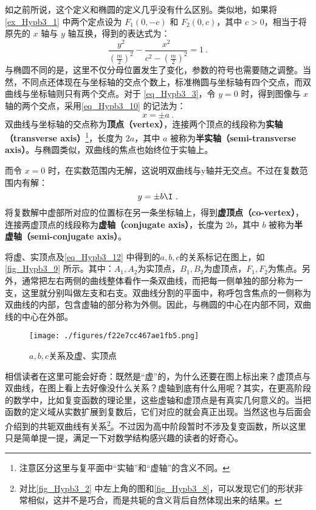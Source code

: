 如之前所说，这个定义和椭圆的定义几乎没有什么区别。类似地，如果将 \autoref{ex_Hypb3_1} 中两个定点设为 $F_1(0,-c)$ 和 $F_2(0,c)$，其中 $c>0$，相当于将原先的 $x$ 轴与 $y$ 轴互换，得到的表达式为：
\begin{equation}\label{eq_Hypb3_7}
\frac{y^2}{\left(\displaystyle\frac{m}{2}\right)^2}-\frac{x^2}{\displaystyle c^2-\left(\frac{m}{2}\right)^2} =1~.
\end{equation}
与椭圆不同的是，这里不仅分母位置发生了变化，参数的符号也需要随之调整。当然，不同点还体现在与坐标轴的交点个数上，标准椭圆与坐标轴有四个交点，而双曲线与坐标轴则只有两个交点。对于 \autoref{eq_Hypb3_3}，令 $y=0$ 时，得到图像与 $x$ 轴的两个交点，采用\autoref{eq_Hypb3_10} 的记法为：
\begin{equation}
x = \pm a~.
\end{equation}
双曲线与坐标轴的交点称为\textbf{顶点（vertex）}，连接两个顶点的线段称为\textbf{实轴（transverse axis）}\footnote{注意区分这里与复平面中“实轴”和“虚轴”的含义不同。}，长度为 $2a$，其中 $a$ 被称为\textbf{半实轴（semi-transverse axis）}。与椭圆类似，双曲线的焦点也始终位于实轴上。

而令 $x=0$ 时，在实数范围内无解，这说明双曲线与y轴并无交点。不过在复数范围内有解：
\begin{equation}
y = \pm  b\I~.
\end{equation}
将复数解中虚部所对应的位置标在另一条坐标轴上，得到\textbf{虚顶点（co-vertex）}，连接两虚顶点的线段称为\textbf{虚轴（conjugate axis）}，长度为 $2b$，其中 $b$ 被称为\textbf{半虚轴（semi-conjugate axis）}。

将虚、实顶点及\autoref{eq_Hypb3_12} 中得到的$a,b,c$的关系标记在图上，如\autoref{fig_Hypb3_9} 所示。其中：$A_1,A_2$为实顶点，$B_1,B_2$为虚顶点，$F_1,F_2$为焦点。另外，通常把左右两侧的曲线整体看作一条双曲线，而把每一侧单独的部分称为一支，这里就分别叫做左支和右支。双曲线分割的平面中，称呼包含焦点的一侧称为双曲线的内部，包含虚轴的部分称为外侧。因此，与椭圆的中心在内部不同，双曲线的中心在外部。

\begin{figure}[ht]
\centering
\texttt{[image: ./figures/f22e7cc467ae1fb5.png]}
\caption{$a,b,c$关系及虚、实顶点} \label{fig_Hypb3_9}
\end{figure}

相信读者在这里可能会好奇：既然是“虚”的，为什么还要在图上标出来？虚顶点与双曲线，在图上看上去好像没什么关系？虚轴到底有什么用呢？其实，在更高阶段的数学中，比如复变函数的理论里，这些虚轴和虚顶点是有真实几何意义的。当把函数的定义域从实数扩展到复数后，它们对应的就会真正出现。当然这也与后面会介绍到的共轭双曲线有关系\footnote{对比\autoref{fig_Hypb3_2} 中左上角的图和\autoref{fig_Hypb3_8}，可以发现它们的形状非常相似，这并不是巧合，而是共轭的含义背后自然体现出来的结果。}。不过因为高中阶段暂时不涉及复变函数，所以这里只是简单提一提，满足一下对数学结构感兴趣的读者的好奇心。

